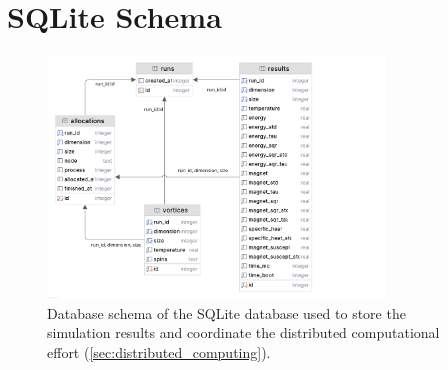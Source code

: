\section{SQLite Schema}\label{app:schema}
\begin{figure}[H]
	\centering
	\includegraphics[width=0.8\textwidth]{Schema.png}
	\caption{Database schema of the SQLite database used to store the simulation results and coordinate the distributed computational effort (\cref{sec:distributed_computing}).}
	\label{fig:schema}
\end{figure}

